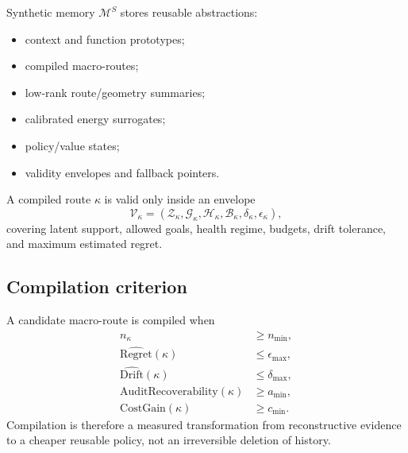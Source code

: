 \documentclass[10pt]{article}
\newcommand{\M}{\mathcal{M}}
\begin{document}
Synthetic memory $\M^S$ stores reusable abstractions:
\begin{itemize}
  \item context and function prototypes;
  \item compiled macro-routes;
  \item low-rank route/geometry summaries;
  \item calibrated energy surrogates;
  \item policy/value states;
  \item validity envelopes and fallback pointers.
\end{itemize}

A compiled route $\kappa$ is valid only inside an envelope
\begin{equation}
  \mathcal V_\kappa=(\mathcal Z_\kappa,\mathcal G_\kappa,\mathcal H_\kappa,\mathcal B_\kappa,\delta_\kappa,\epsilon_\kappa),
  \label{eq:envelope}
\end{equation}
covering latent support, allowed goals, health regime, budgets, drift tolerance, and maximum estimated regret.

\subsection{Compilation criterion}

A candidate macro-route is compiled when
\begin{align}
  n_\kappa &\ge n_{\min},\\
  \widehat{\mathrm{Regret}}(\kappa)&\le\epsilon_{\max},\\
  \widehat{\mathrm{Drift}}(\kappa)&\le\delta_{\max},\\
  \mathrm{AuditRecoverability}(\kappa)&\ge a_{\min},\\
  \mathrm{CostGain}(\kappa)&\ge c_{\min}.
\end{align}
Compilation is therefore a measured transformation from reconstructive evidence to a cheaper reusable policy, not an irreversible deletion of history.
\end{document}
